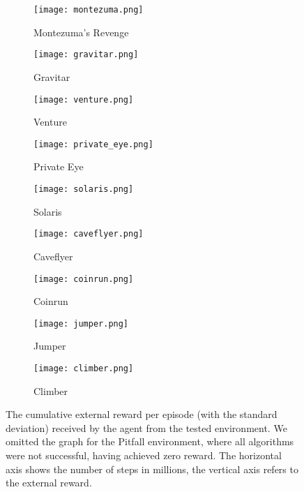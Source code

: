 \documentclass[a4paper,11pt]{elsarticle}
\begin{document}
\begin{figure}[t!]
  \centering
  \begin{subfigure}[b]{0.32\textwidth}
    \centering
    \texttt{[image: montezuma.png]}
    \caption{Montezuma's Revenge}
    \label{fig:res2a}
  \end{subfigure}
  \begin{subfigure}[b]{0.32\textwidth}
    \centering
    \texttt{[image: gravitar.png]}
    \caption{Gravitar}
    \label{fig:res2b}
  \end{subfigure}  
  \begin{subfigure}[b]{0.32\textwidth}
    \centering
    \texttt{[image: venture.png]}
    \caption{Venture}
    \label{fig:res2c}
  \end{subfigure}
  \begin{subfigure}[b]{0.32\textwidth}
    \centering
    \texttt{[image: private\_eye.png]}
    \caption{Private Eye}
    \label{fig:res2d}
  \end{subfigure} 
  \begin{subfigure}[b]{0.32\textwidth}
    \centering
    \texttt{[image: solaris.png]}
    \caption{Solaris}
    \label{fig:res2f}
  \end{subfigure}
    \begin{subfigure}[b]{0.32\textwidth}
    \centering
    \texttt{[image: caveflyer.png]}
    \caption{Caveflyer}
    \label{fig:res2g}
  \end{subfigure}
    \begin{subfigure}[b]{0.32\textwidth}
    \centering
    \texttt{[image: coinrun.png]}
    \caption{Coinrun}
    \label{fig:res2h}
  \end{subfigure}
    \begin{subfigure}[b]{0.32\textwidth}
    \centering
    \texttt{[image: jumper.png]}
    \caption{Jumper}
    \label{fig:res2i}
  \end{subfigure}
    \begin{subfigure}[b]{0.32\textwidth}
    \centering
    \texttt{[image: climber.png]}
    \caption{Climber}
    \label{fig:res2j}
  \end{subfigure}
\caption{The cumulative external reward per episode (with the standard deviation) received by the agent from the tested environment. We omitted the graph for the Pitfall environment, where all algorithms were not successful, having achieved zero reward. The horizontal axis shows the number of steps in millions, the vertical axis refers to the external reward.}
\label{fig:result}
\end{figure}
\end{document}
